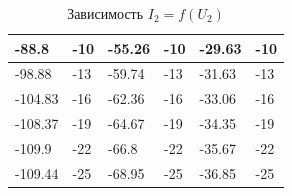 \documentclass[a4paper,12pt]{article}
\begin{document}
\begin{table}[h]
\begin{tabular}{|l|l|l|l|l|l|}
-88.8           & -10       & -55.26         & -10       & -29.63          & -10        \\ \hline
-98.88          & -13       & -59.74         & -13       & -31.63          & -13        \\ \hline
-104.83         & -16       & -62.36         & -16       & -33.06          & -16        \\ \hline
-108.37         & -19       & -64.67         & -19       & -34.35          & -19        \\ \hline
-109.9          & -22       & -66.8          & -22       & -35.67          & -22        \\ \hline
-109.44         & -25       & -68.95         & -25       & -36.85          & -25        \\ \hline
\end{tabular}
\caption{Зависимость $I_2 = f(U_2)$}
\end{table}
\end{document}
